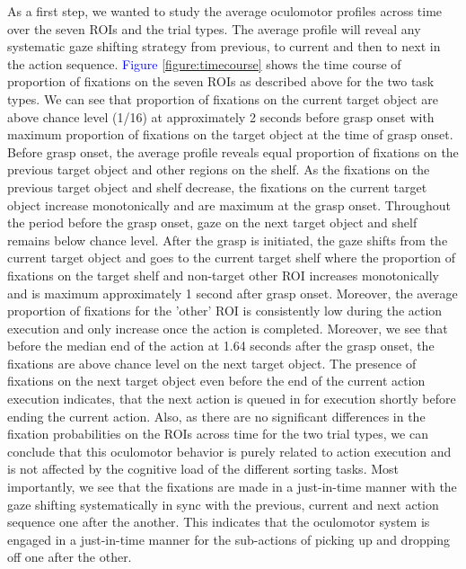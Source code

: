 As a first step, we wanted to study the average oculomotor profiles across time over the seven ROIs and the trial types. The average profile will reveal any systematic gaze shifting strategy from previous, to current and then to next in the action sequence. \textcolor{Blue}{Figure \ref{figure:timecourse}} shows the time course of proportion of fixations on the seven ROIs as described above for the two task types. We can see that proportion of fixations on the current target object are above chance level (1/16) at approximately 2 seconds before grasp onset with maximum proportion of fixations on the target object at the time of grasp onset. Before grasp onset, the average profile reveals equal proportion of fixations on the previous target object and other regions on the shelf. As the fixations on the previous target object and shelf decrease, the fixations on the current target object increase monotonically and are maximum at the grasp onset. Throughout the period before the grasp onset, gaze on the next target object and shelf remains below chance level. After the grasp is initiated, the gaze shifts from the current target object and goes to the current target shelf where the proportion of fixations on the target shelf and non-target other ROI increases monotonically and is maximum approximately 1 second after grasp onset. Moreover, the average proportion of fixations for the 'other' ROI is consistently low during the action execution and only increase once the action is completed. Moreover, we see that before the median end of the action at 1.64 seconds after the grasp onset, the fixations are above chance level on the next target object. The presence of fixations on the next target object even before the end of the current action execution indicates, that the next action is queued in for execution shortly before ending the current action. Also, as there are no significant differences in the fixation probabilities on the ROIs across time for the two trial types, we can conclude that this oculomotor behavior is purely related to action execution and is not affected by the cognitive load of the different sorting tasks. Most importantly, we see that the fixations are made in a just-in-time manner with the gaze shifting systematically in sync with the previous, current and next action sequence one after the another. This indicates that the oculomotor system is engaged in a just-in-time manner for the sub-actions of picking up and dropping off one after the other.

